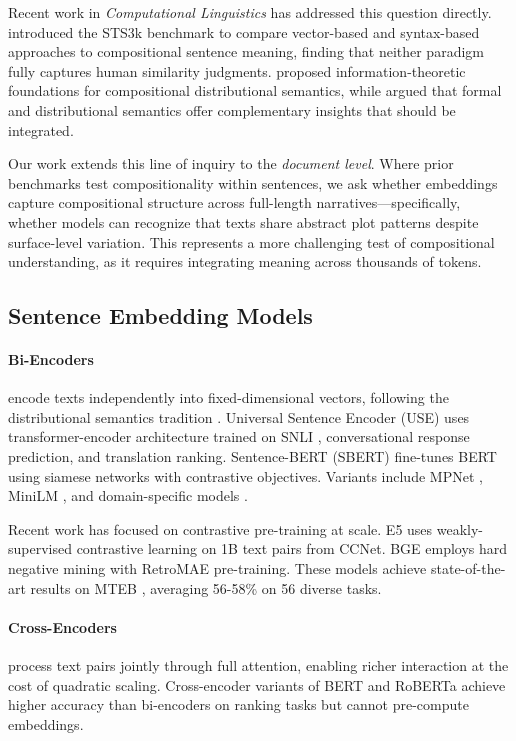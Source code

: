 \documentclass[11pt]{article}
\begin{document}
Recent work in \textit{Computational Linguistics} has addressed this question directly. \citet{Fodor2025Compositionality} introduced the STS3k benchmark to compare vector-based and syntax-based approaches to compositional sentence meaning, finding that neither paradigm fully captures human similarity judgments. \citet{VanDerWerfITCDS2022} proposed information-theoretic foundations for compositional distributional semantics, while \citet{Asher2024FormalDistributional} argued that formal and distributional semantics offer complementary insights that should be integrated.

Our work extends this line of inquiry to the \textit{document level}. Where prior benchmarks test compositionality within sentences, we ask whether embeddings capture compositional structure across full-length narratives---specifically, whether models can recognize that texts share abstract plot patterns despite surface-level variation. This represents a more challenging test of compositional understanding, as it requires integrating meaning across thousands of tokens.

\subsection{Sentence Embedding Models}

\paragraph{Bi-Encoders} encode texts independently into fixed-dimensional vectors, following the distributional semantics tradition \cite{Turney2010VSM}. Universal Sentence Encoder (USE) \cite{Cer2018} uses transformer-encoder architecture trained on SNLI \cite{Bowman2015}, conversational response prediction, and translation ranking. Sentence-BERT (SBERT) \cite{Reimers2019} fine-tunes BERT \cite{Devlin2019} using siamese networks with contrastive objectives. Variants include MPNet \cite{Song2020}, MiniLM \cite{Wang2020}, and domain-specific models \cite{Gao2021SimCSE}.

Recent work has focused on contrastive pre-training at scale. E5 \cite{Wang2022} uses weakly-supervised contrastive learning on 1B text pairs from CCNet. BGE \cite{Xiao2023} employs hard negative mining with RetroMAE \cite{Liu2022RetroMAE} pre-training. These models achieve state-of-the-art results on MTEB \cite{Muennighoff2023MTEB}, averaging 56-58\% on 56 diverse tasks.

\paragraph{Cross-Encoders} \cite{Humeau2020Poly} process text pairs jointly through full attention, enabling richer interaction at the cost of quadratic scaling. Cross-encoder variants of BERT and RoBERTa \cite{Liu2019RoBERTa} achieve higher accuracy than bi-encoders on ranking tasks \cite{Nogueira2019PassageReranking} but cannot pre-compute embeddings.
\end{document}
